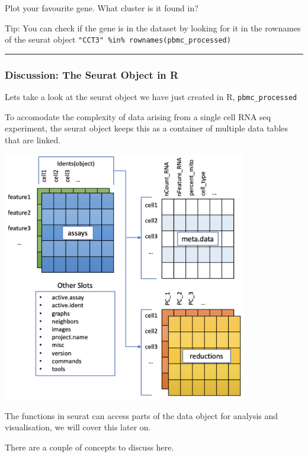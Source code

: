 \documentclass[
]{book}
\begin{document}
Plot your favourite gene. What cluster is it found in?

Tip: You can check if the gene is in the dataset by looking for it in the rownames of the seurat object \texttt{"CCT3"\ \%in\%\ rownames(pbmc\_processed)}

\begin{center}\rule{0.5\linewidth}{0.5pt}\end{center}

\hypertarget{discussion-the-seurat-object-in-r}{%
\subsubsection*{Discussion: The Seurat Object in R}\label{discussion-the-seurat-object-in-r}}

Lets take a look at the seurat object we have just created in R, \texttt{pbmc\_processed}

To accomodate the complexity of data arising from a single cell RNA seq experiment, the seurat object keeps this as a container of multiple data tables that are linked.

\includegraphics[width=0.8\textwidth,height=\textheight]{images/seuratobject.png}

The functions in seurat can access parts of the data object for analysis and visualisation, we will cover this later on.

There are a couple of concepts to discuss here.
\end{document}
